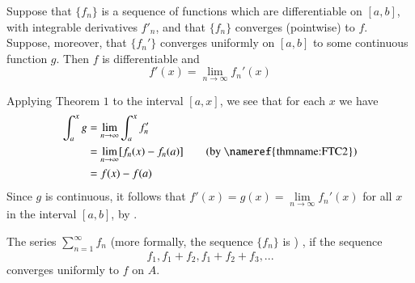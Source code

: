 \documentclass[12pt]{report}
\begin{document}
\begin{thm}{}{}
    Suppose that $\{f_n\}$ is a sequence of functions which are differentiable on $[a,b]$, with integrable derivatives $f'_n$, and that $\{f_n\}$ converges (pointwise) to $f$. Suppose, moreover, that $\{f_n'\}$ converges uniformly on $[a,b]$ to some continuous function $g$. Then $f$ is differentiable and \begin{equation*}
        f'(x) = \lim\limits_{n\rightarrow \infty}f_n'(x)
    \end{equation*}
\end{thm}
\begin{proof*}{}{}
    Applying Theorem $1$ to the interval $[a,x]$, we see that for each $x$ we have \begin{align*}
        \int_a^xg &= \lim\limits_{n\rightarrow \infty}\int_a^xf'_n \\
        &= \lim\limits_{n\rightarrow \infty}[f_n(x) - f_n(a)] \tag{by \nameref{thmname:FTC2}} \\
        &= f(x) - f(a)
    \end{align*}
    Since $g$ is continuous, it follows that $f'(x) = g(x) = \lim\limits_{n\rightarrow \infty}f_n'(x)$ for all $x$ in the interval $[a,b]$, by .
\end{proof*}

\begin{defn}{}{}
    The series $\sum\limits_{n=1}^{\infty}f_n$  (more formally, the sequence $\{f_n\}$ is ) , if the sequence \begin{equation*}
        f_1, f_1+f_2,f_1+f_2+f_3,...
    \end{equation*}
    converges uniformly to $f$ on $A$.
\end{defn}
\end{document}

